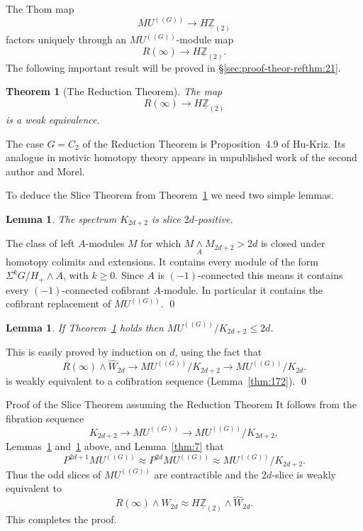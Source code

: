 \documentclass{amsart}
\newtheorem{thm}[equation]{Theorem}
\newtheorem{lem}[equation]{Lemma}
\theoremstyle{definition}
\theoremstyle{remark}
\newenvironment{pf}{\bigskip{\em Proof:\/}}{\qed\medskip}
\newenvironment{pf*}[1]{\bigskip{\em #1:\/}}{\qed\medskip}
\newcommand{\Z}{{\mathbb Z}}
\newcommand{\mutn}[1]{MU^{(\!(#1)\!)}}
\newcommand{\smashove}[1]{\underset{#1}{\wedge}}
\newcommand{\zltm}{\underline{\Z}_{(2)}}
\newcommand{\zt}{C_{2}}
\newcommand{\refine}{\widehat{W}}
\begin{document}
The Thom map
\[
\mutn{G}\to H\zltm
\]
factors uniquely through an $\mutn{G}$-module map
\[
R(\infty)\to H\zltm.
\]
The following important result will be proved in
\S\ref{sec:proof-theor-refthm:21}.

\begin{thm}[The Reduction Theorem]
\label{thm:21}
The map
\[
R(\infty)\to H\zltm
\]
is a weak equivalence.
\end{thm}

The case $G=\zt$ of the Reduction Theorem is Proposition~4.9 of
Hu-Kriz\cite{MR1808224}.  Its analogue in motivic homotopy theory
appears in unpublished work of the second author and Morel.

To deduce the Slice Theorem from Theorem~\ref{thm:21} we need two
simple lemmas.


\begin{lem}
\label{thm:92}
The spectrum $K_{2d+2}$ is slice $2d$-positive.  
\end{lem}

\begin{pf}
The class of left $A$-modules $M$ for which $M\smashove{A}M_{2d+2}>2d$
is closed under homotopy colimits and extensions.   It contains every
module of the form $\Sigma^{k}G/H_{+}\wedge A$, with $k\ge 0$.   Since
$A$ is $(-1)$-connected this means it contains every $(-1)$-connected
cofibrant $A$-module.   In particular it contains the cofibrant
replacement of $\mutn{G}$.
\end{pf}

\begin{lem}
\label{thm:93}
If Theorem~\ref{thm:21} holds then $\mutn{G}/K_{2d+2}\le 2d$.
\end{lem}

\begin{pf}
This is easily proved by induction on $d$, using the fact that
\[
R(\infty)\wedge 
\refine_{2d}\to \mutn{G}/K_{2d+2} \to \mutn{G}/K_{2d}.
\]
is weakly equivalent to a cofibration sequence (Lemma~\ref{thm:172}).
\end{pf}



\begin{pf*}{Proof of the Slice Theorem assuming the Reduction Theorem}
It follows from the fibration sequence
\[
K_{2d+2}\to\mutn{G}\to \mutn{G}/K_{2d+2}, 
\]
Lemmas~\ref{thm:92} and~\ref{thm:93} above, and Lemma~\ref{thm:7} that 
\[
P^{2d+1}\mutn{G} \approx P^{2d}\mutn{G} \approx \mutn{G}/K_{2d+2}.
\]
Thus the odd slices of $\mutn{G}$ are contractible and the $2d$-slice
is weakly equivalent to 
\[
R(\infty)\wedge \refine_{2d}\approx
H\zltm\wedge \refine_{2d}.
\]
This completes the proof.
\end{pf*}
\end{document}
